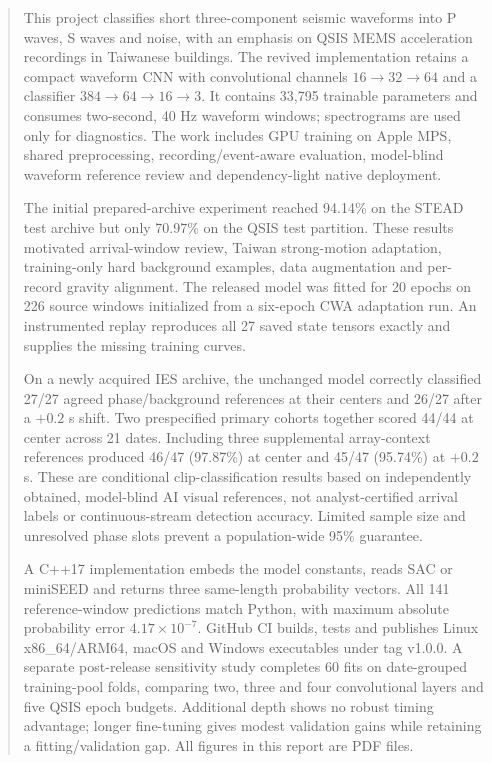 \documentclass[a4paper,11pt,oneside]{article}
\begin{document}
\begin{abstract}
This project classifies short three-component seismic waveforms into P waves,
S waves and noise, with an emphasis on QSIS MEMS acceleration recordings in
Taiwanese buildings. The revived implementation retains a compact waveform
CNN with convolutional channels $16\rightarrow32\rightarrow64$ and a classifier
$384\rightarrow64\rightarrow16\rightarrow3$. It contains 33,795 trainable
parameters and consumes two-second, 40 Hz waveform windows; spectrograms are
used only for diagnostics. The work includes GPU training on Apple MPS,
shared preprocessing, recording/event-aware evaluation, model-blind waveform
reference review and dependency-light native deployment.

The initial prepared-archive experiment reached 94.14\% on the STEAD test
archive but only 70.97\% on the QSIS test partition. These results motivated
arrival-window review, Taiwan strong-motion adaptation, training-only hard
background examples, data augmentation and per-record gravity alignment.
The released model was fitted for 20 epochs on 226 source windows initialized
from a six-epoch CWA adaptation run. An instrumented replay reproduces all
27 saved state tensors exactly and supplies the missing training curves.

On a newly acquired IES archive, the unchanged model correctly classified
27/27 agreed phase/background references at their centers and 26/27 after a
$+0.2$ s shift. Two prespecified primary cohorts together scored 44/44 at
center across 21 dates. Including three supplemental array-context references
produced 46/47 (97.87\%) at center and 45/47 (95.74\%) at $+0.2$ s. These are
conditional clip-classification results based on independently obtained,
model-blind AI visual references, not analyst-certified arrival labels or
continuous-stream detection accuracy. Limited sample size and unresolved
phase slots prevent a population-wide 95\% guarantee.

A C++17 implementation embeds the model constants, reads SAC or miniSEED and
returns three same-length probability vectors. All 141 reference-window
predictions match Python, with maximum absolute probability error
$4.17\times10^{-7}$. GitHub CI builds, tests and publishes Linux x86\_64/ARM64, macOS and
Windows executables under tag v1.0.0. A separate post-release sensitivity study completes 60 fits on date-grouped
training-pool folds, comparing two, three and four convolutional layers and
five QSIS epoch budgets. Additional depth shows no robust timing advantage;
longer fine-tuning gives modest validation gains while retaining a
fitting/validation gap. All figures in this report are PDF files.
\end{abstract}
\end{document}
